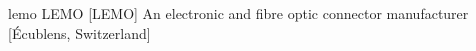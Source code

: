 \newglsXcompany%
{lemo}%
{LEMO\textsuperscript{\textregistered}}%
[LEMO]%
{An electronic and fibre optic connector manufacturer \cite{website:LEMO}}%
[\'Ecublens, Switzerland]%